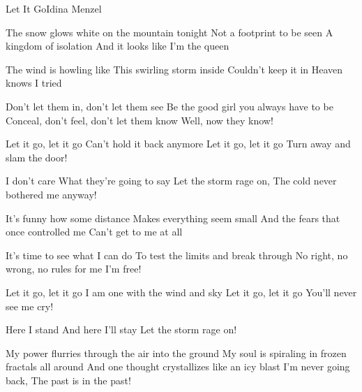 \begin{Song}{Let It Go}{Idina Menzel}
\begin{multicols}{2}

\begin{Verse}
The snow glows white on the mountain tonight
Not a footprint to be seen
A kingdom of isolation
And it looks like I'm the queen
\espaceInterStrophe

The wind is howling like
This swirling storm inside
Couldn't keep it in
Heaven knows I tried
\end{Verse}
\espaceInterStrophe

\begin{PreChorus}
Don't let them in, don't let them see
Be the good girl you always have to be
Conceal, don't feel, don't let them know
Well, now they know!
\end{PreChorus}
\espaceInterStrophe

\begin{Chorus}
Let it go, let it go
Can't hold it back anymore
Let it go, let it go
Turn away and slam the door!
\espaceInterStrophe

I don't care
What they're going to say
Let the storm rage on,
The cold never bothered me anyway!
\end{Chorus}
\espaceInterStrophe

\begin{Verse}
It's funny how some distance
Makes everything seem small
And the fears that once controlled me
Can't get to me at all
\end{Verse}
\espaceInterStrophe

\begin{PreChorus}
It's time to see what I can do
To test the limits and break through
No right, no wrong, no rules for me
I'm free!
\end{PreChorus}
\espaceInterStrophe

\begin{Chorus}
Let it go, let it go
I am one with the wind and sky
Let it go, let it go
You'll never see me cry!
\espaceInterStrophe

Here I stand
And here I'll stay
Let the storm rage on!
\end{Chorus}
\espaceInterStrophe

\begin{Bridge}
My power flurries through the air into the ground
My soul is spiraling in frozen fractals all around
And one thought crystallizes like an icy blast
I'm never going back,
The past is in the past!
\end{Bridge}
\espaceInterStrophe


\end{multicols}
\end{Song}
